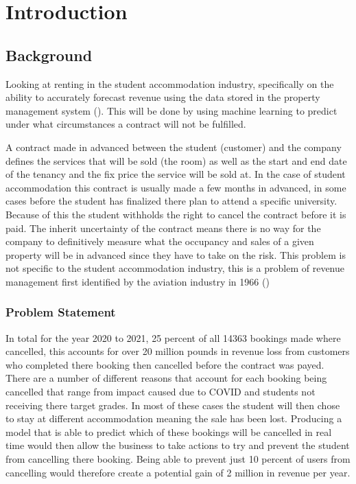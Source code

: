 \chapter{Introduction}

\section{Background}
Looking at renting in the student accommodation industry, specifically on the ability to accurately forecast revenue using the data stored in the property management system (\cite{Jain2006IntellectualPerspective}). This will be done by using machine learning to predict under what circumstances a contract will not be fulfilled.

\vspace{5mm}

A contract made in advanced between the student (customer) and the company defines the services that will be sold (the room) as well as the start and end date of the tenancy and the fix price the service will be sold at. In the case of student accommodation this contract is usually made a few months in advanced, in some cases before the student has finalized there plan to attend a specific university. Because of this the student withholds the right to cancel the contract before it is paid. The inherit uncertainty of the contract means there is no way for the company to definitively measure what the occupancy and sales of a given property will be in advanced since they have to take on the risk. This problem is not specific to the student accommodation industry, this is a problem of revenue management first identified by the aviation industry in 1966  (\cite{Chiang2007AnResearch})


\subsection{Problem Statement}

In total for the year 2020 to 2021, 25 percent of all 14363 bookings made where cancelled, this accounts for over 20 million pounds in revenue loss from customers who completed there booking then cancelled before the contract was payed. There are a number of different reasons that account for each booking being cancelled that range from impact caused due to COVID and students not receiving there target grades. In most of these cases the student will then chose to stay at different accommodation meaning the sale has been lost. Producing a model that is able to predict which of these bookings will be cancelled in real time would then allow the business to take actions to try and prevent the student from cancelling there booking. Being able to prevent just 10 percent of users from cancelling would therefore create a potential gain of 2 million in revenue per year.  

